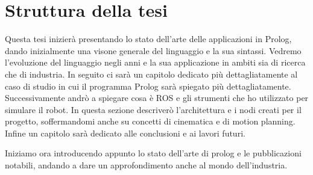 \section{Struttura della tesi}
\label{sec:struttura}
Questa tesi inizierà presentando lo stato dell'arte delle applicazioni in Prolog, dando inizialmente una visone generale del linguaggio e la sua sintassi. Vedremo l'evoluzione del linguaggio negli anni e la sua applicazione in ambiti sia di ricerca che di industria.
In seguito ci sarà un capitolo dedicato più dettagliatamente al caso di studio in cui il programma Prolog sarà spiegato più dettagliatamente. 
Successivamente andrò a spiegare cosa è ROS e gli strumenti che ho utilizzato per simulare il robot. In questa sezione descriverò l'architettura e i nodi creati per il progetto, soffermandomi anche su concetti di cinematica e di motion planning.
Infine un capitolo sarà dedicato alle conclusioni e ai lavori futuri.

Iniziamo ora introducendo appunto lo stato dell'arte di prolog e le pubblicazioni notabili, andando a dare un approfondimento anche al mondo dell'industria.

